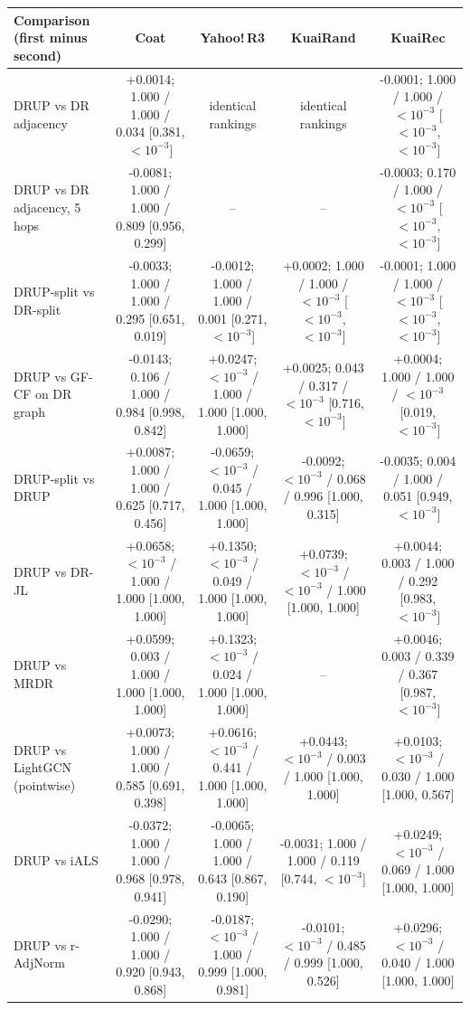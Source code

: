 \begin{tabular}{lcccc}
\toprule
Comparison (first minus second) & Coat & Yahoo!\,R3 & KuaiRand & KuaiRec\\
\midrule
DRUP vs DR adjacency & +0.0014; 1.000 / 1.000 / 0.034 [0.381, $<10^{-3}$] & identical rankings & identical rankings & -0.0001; 1.000 / 1.000 / $<10^{-3}$ [$<10^{-3}$, $<10^{-3}$]\\
DRUP vs DR adjacency, 5 hops & -0.0081; 1.000 / 1.000 / 0.809 [0.956, 0.299] & -- & -- & -0.0003; 0.170 / 1.000 / $<10^{-3}$ [$<10^{-3}$, $<10^{-3}$]\\
DRUP-split vs DR-split & -0.0033; 1.000 / 1.000 / 0.295 [0.651, 0.019] & -0.0012; 1.000 / 1.000 / 0.001 [0.271, $<10^{-3}$] & +0.0002; 1.000 / 1.000 / $<10^{-3}$ [$<10^{-3}$, $<10^{-3}$] & -0.0001; 1.000 / 1.000 / $<10^{-3}$ [$<10^{-3}$, $<10^{-3}$]\\
DRUP vs GF-CF on DR graph & -0.0143; 0.106 / 1.000 / 0.984 [0.998, 0.842] & +0.0247; $<10^{-3}$ / 1.000 / 1.000 [1.000, 1.000] & +0.0025; 0.043 / 0.317 / $<10^{-3}$ [0.716, $<10^{-3}$] & +0.0004; 1.000 / 1.000 / $<10^{-3}$ [0.019, $<10^{-3}$]\\
DRUP-split vs DRUP & +0.0087; 1.000 / 1.000 / 0.625 [0.717, 0.456] & -0.0659; $<10^{-3}$ / 0.045 / 1.000 [1.000, 1.000] & -0.0092; $<10^{-3}$ / 0.068 / 0.996 [1.000, 0.315] & -0.0035; 0.004 / 1.000 / 0.051 [0.949, $<10^{-3}$]\\
DRUP vs DR-JL & +0.0658; $<10^{-3}$ / 1.000 / 1.000 [1.000, 1.000] & +0.1350; $<10^{-3}$ / 0.049 / 1.000 [1.000, 1.000] & +0.0739; $<10^{-3}$ / $<10^{-3}$ / 1.000 [1.000, 1.000] & +0.0044; 0.003 / 1.000 / 0.292 [0.983, $<10^{-3}$]\\
DRUP vs MRDR & +0.0599; 0.003 / 1.000 / 1.000 [1.000, 1.000] & +0.1323; $<10^{-3}$ / 0.024 / 1.000 [1.000, 1.000] & -- & +0.0046; 0.003 / 0.339 / 0.367 [0.987, $<10^{-3}$]\\
DRUP vs LightGCN (pointwise) & +0.0073; 1.000 / 1.000 / 0.585 [0.691, 0.398] & +0.0616; $<10^{-3}$ / 0.441 / 1.000 [1.000, 1.000] & +0.0443; $<10^{-3}$ / 0.003 / 1.000 [1.000, 1.000] & +0.0103; $<10^{-3}$ / 0.030 / 1.000 [1.000, 0.567]\\
DRUP vs iALS & -0.0372; 1.000 / 1.000 / 0.968 [0.978, 0.941] & -0.0065; 1.000 / 1.000 / 0.643 [0.867, 0.190] & -0.0031; 1.000 / 1.000 / 0.119 [0.744, $<10^{-3}$] & +0.0249; $<10^{-3}$ / 0.069 / 1.000 [1.000, 1.000]\\
DRUP vs r-AdjNorm & -0.0290; 1.000 / 1.000 / 0.920 [0.943, 0.868] & -0.0187; $<10^{-3}$ / 1.000 / 0.999 [1.000, 0.981] & -0.0101; $<10^{-3}$ / 0.485 / 0.999 [1.000, 0.526] & +0.0296; $<10^{-3}$ / 0.040 / 1.000 [1.000, 1.000]\\
\bottomrule
\end{tabular}
